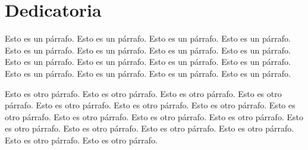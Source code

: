 \hidefromtoc %
\chapter*{Dedicatoria}
\unhidefromtoc %


Esto es un párrafo. Esto es un párrafo. Esto es un párrafo. Esto es un párrafo. Esto es un párrafo. Esto es un párrafo. Esto es un párrafo. Esto es un párrafo. Esto es un párrafo. Esto es un párrafo. Esto es un párrafo. Esto es un párrafo. Esto es un párrafo. Esto es un párrafo. Esto es un párrafo. Esto es un párrafo. 


Esto es otro párrafo. Esto es otro párrafo. Esto es otro párrafo. Esto es otro párrafo. Esto es otro párrafo. Esto es otro párrafo. Esto es otro párrafo. Esto es otro párrafo. Esto es otro párrafo. Esto es otro párrafo. Esto es otro párrafo. Esto es otro párrafo. Esto es otro párrafo. Esto es otro párrafo. Esto es otro párrafo. Esto es otro párrafo. Esto es otro párrafo. 

\newpage